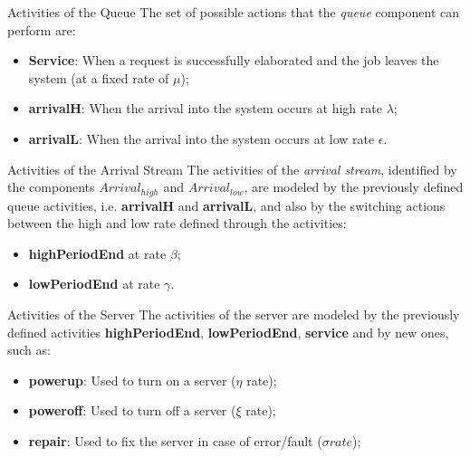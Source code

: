 \documentclass[8pt]{beamer}
\begin{document}
    \begin{frame}{Activities of the Queue}
        The set of possible actions that the \textit{queue} component can perform are:
        \vspace{1cm}
        \begin{itemize}
            \item \textbf{Service}: When a request is successfully elaborated and the job leaves the system (at a fixed rate of \(\mu\));
            \item \textbf{arrivalH}: When the arrival into the system occurs at high rate \(\lambda\);
            \item \textbf{arrivalL}: When the arrival into the system occurs at low rate \(\epsilon\).
        \end{itemize}
    \end{frame}

    \begin{frame}{Activities of the Arrival Stream}
        The activities of the \textit{arrival stream},  identified by the components \(Arrival_{high}\) and \(Arrival_{low}\), are modeled by the previously defined queue activities, i.e. \textbf{arrivalH} and \textbf{arrivalL}, and also by the switching actions between the high and low rate defined through the activities:
        \vspace{1cm}
        \begin{itemize}
            \item \textbf{highPeriodEnd} at rate \(\beta\);
            \item \textbf{lowPeriodEnd} at rate \(\gamma\).
        \end{itemize}
    \end{frame}

    \begin{frame}{Activities of the Server}
        The activities of the server are modeled by the previously defined activities \textbf{highPeriodEnd}, \textbf{lowPeriodEnd}, \textbf{service} and by new ones, such as:
        \vspace{1cm}
        \begin{itemize}
            \item \textbf{powerup}: Used to turn on a server (\(\eta\) rate);
            \item \textbf{poweroff}: Used to turn off a server (\(\xi\) rate);
            \item \textbf{repair}: Used to fix the server in case of error/fault (\(\sigma  rate\));
        \end{itemize}
    \end{frame}
 
\end{document}

